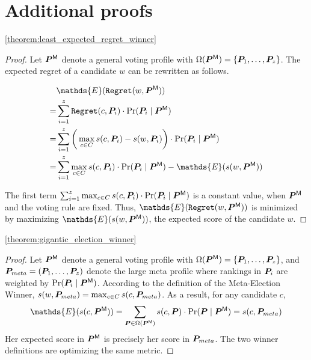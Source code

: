 \appendix

\section{Additional proofs}
\label{sec:appendix:proofs}

\begin{reptheorem}{\ref{theorem:least_expected_regret_winner}}
    \theoremLeastExpectedRegretWinner
\end{reptheorem}

\begin{proof}
    Let $\probaVP$ denote a general voting profile with $\Omega(\probaVP)=\set{\enum[\numPW]{\VP}}$.
    The expected regret of a candidate $w$ can be rewritten as follows.
    
    \begin{align*}
        & \mathds{E}(\txt{Regret}(w, \probaVP)) \\
        =& \sum_{i=1}^z \txt{Regret}(c, \completeVP_i) \cdot \Pr(\completeVP_i \mid \probaVP) \\
        =& \sum_{i=1}^z \bigg( \max_{c \in C} \score(c, \completeVP_i) - \score(w, \completeVP_i) \bigg) \cdot \Pr(\completeVP_i \mid \probaVP) \\
        =& \sum_{i=1}^z \max_{c \in C} \score(c, \completeVP_i) \cdot \Pr(\completeVP_i \mid \probaVP)  - \mathds{E}(\score(w, \probaVP))\\
    \end{align*}
    
    The first term $\sum_{i=1}^z \max_{c \in C} \score(c, \completeVP_i) \cdot \Pr(\completeVP_i \mid \probaVP)$ is a constant value, when $\probaVP$ and the voting rule are fixed.
    Thus, $\mathds{E}(\txt{Regret}(w, \probaVP))$ is minimized by maximizing $\mathds{E}(\score(w, \probaVP))$, the expected score of the candidate $w$.
\end{proof}

\begin{reptheorem}{\ref{theorem:gigantic_election_winner}}
    \theoremGiganticElectionWinner
\end{reptheorem}

\begin{proof}
    Let $\probaVP$ denote a general voting profile with $\Omega(\probaVP)=\set{\enum[\numPW]{\VP}}$, and $\completeVP_{meta} = (\completeVP_1, \ldots, \completeVP_\numPW)$ denote the large meta profile where rankings in $\completeVP_i$ are weighted by $\Pr(\completeVP_i \mid \probaVP)$.
    According to the definition of the Meta-Election Winner, $\score(w, \completeVP_{meta}) = \max_{c \in C} \score(c, \completeVP_{meta})$.
    As a result, for any candidate $c$,
    \[
    \mathds{E}(\score(c, \probaVP)) = \sum_{\completeVP \in \Omega(\probaVP)} \score(c, \completeVP) \cdot \Pr(\completeVP \mid \probaVP) = \score(c, \completeVP_{meta})
    \]
    Her expected score in $\probaVP$ is precisely her score in $\completeVP_{meta}$.
    The two winner definitions are optimizing the same metric.
\end{proof}


